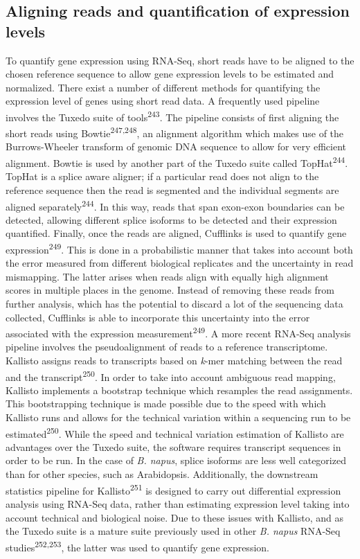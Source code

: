 \documentclass[12pt,]{book}
\begin{document}
\subsection{Aligning reads and quantification of expression
levels}\label{section:spring:alignreadexplevel}

To quantify gene expression using RNA-Seq, short reads have to be
aligned to the chosen reference sequence to allow gene expression levels
to be estimated and normalized. There exist a number of different
methods for quantifying the expression level of genes using short read
data. A frequently used pipeline involves the Tuxedo suite of
tools\textsuperscript{243}. The pipeline consists of first aligning the
short reads using Bowtie\textsuperscript{247,248}, an alignment
algorithm which makes use of the Burrows-Wheeler transform of genomic
DNA sequence to allow for very efficient alignment. Bowtie is used by
another part of the Tuxedo suite called TopHat\textsuperscript{244}.
TopHat is a splice aware aligner; if a particular read does not align to
the reference sequence then the read is segmented and the individual
segments are aligned separately\textsuperscript{244}. In this way, reads
that span exon-exon boundaries can be detected, allowing different
splice isoforms to be detected and their expression quantified. Finally,
once the reads are aligned, Cufflinks is used to quantify gene
expression\textsuperscript{249}. This is done in a probabilistic manner
that takes into account both the error measured from different
biological replicates and the uncertainty in read mismapping. The latter
arises when reads align with equally high alignment scores in multiple
places in the genome. Instead of removing these reads from further
analysis, which has the potential to discard a lot of the sequencing
data collected, Cufflinks is able to incorporate this uncertainty into
the error associated with the expression
measurement\textsuperscript{249}. A more recent RNA-Seq analysis
pipeline involves the pseudoalignment of reads to a reference
transcriptome. Kallisto assigns reads to transcripts based on
\emph{k}-mer matching between the read and the
transcript\textsuperscript{250}. In order to take into account ambiguous
read mapping, Kallisto implements a bootstrap technique which resamples
the read assignments. This bootstrapping technique is made possible due
to the speed with which Kallisto runs and allows for the technical
variation within a sequencing run to be estimated\textsuperscript{250}.
While the speed and technical variation estimation of Kallisto are
advantages over the Tuxedo suite, the software requires transcript
sequences in order to be run. In the case of \emph{B. napus}, splice
isoforms are less well categorized than for other species, such as
Arabidopsis. Additionally, the downstream statistics pipeline for
Kallisto\textsuperscript{251} is designed to carry out differential
expression analysis using RNA-Seq data, rather than estimating
expression level taking into account technical and biological noise. Due
to these issues with Kallisto, and as the Tuxedo suite is a mature suite
previously used in other \emph{B. napus} RNA-Seq
studies\textsuperscript{252,253}, the latter was used to quantify gene
expression.
\end{document}
